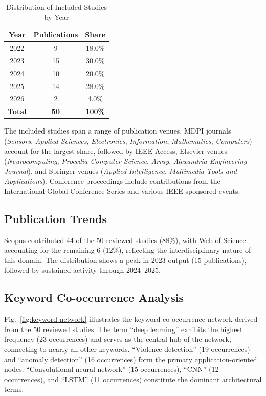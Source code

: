 \documentclass[conference]{IEEEtran}
\begin{document}
\begin{table}[t]
\caption{Distribution of Included Studies by Year}
\begin{center}
\renewcommand{\arraystretch}{1.1}
\begin{tabular}{|c|c|c|}
\hline
\textbf{Year} & \textbf{Publications} & \textbf{Share} \\
\hline
2022 & 9 & 18.0\% \\
2023 & 15 & 30.0\% \\
2024 & 10 & 20.0\% \\
2025 & 14 & 28.0\% \\
2026 & 2 & 4.0\% \\
\hline
\textbf{Total} & \textbf{50} & \textbf{100\%} \\
\hline
\end{tabular}
\label{tab:years}
\end{center}
\end{table}

The included studies span a range of publication venues. MDPI journals (\textit{Sensors}, \textit{Applied Sciences}, \textit{Electronics}, \textit{Information}, \textit{Mathematics}, \textit{Computers}) account for the largest share, followed by IEEE Access, Elsevier venues (\textit{Neurocomputing}, \textit{Procedia Computer Science}, \textit{Array}, \textit{Alexandria Engineering Journal}), and Springer venues (\textit{Applied Intelligence}, \textit{Multimedia Tools and Applications}). Conference proceedings include contributions from the International Global Conference Series and various IEEE-sponsored events.

\subsection{Publication Trends}

Scopus contributed 44 of the 50 reviewed studies (88\%), with Web of Science accounting for the remaining 6 (12\%), reflecting the interdisciplinary nature of this domain. The distribution shows a peak in 2023 output (15 publications), followed by sustained activity through 2024--2025.

\subsection{Keyword Co-occurrence Analysis}

Fig.~\ref{fig:keyword-network} illustrates the keyword co-occurrence network derived from the 50 reviewed studies. The term ``deep learning'' exhibits the highest frequency (23 occurrences) and serves as the central hub of the network, connecting to nearly all other keywords. ``Violence detection'' (19 occurrences) and ``anomaly detection'' (16 occurrences) form the primary application-oriented nodes. ``Convolutional neural network'' (15 occurrences), ``CNN'' (12 occurrences), and ``LSTM'' (11 occurrences) constitute the dominant architectural terms.
\end{document}

